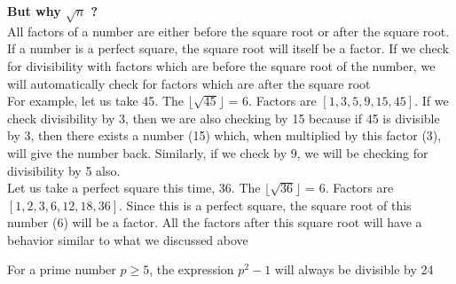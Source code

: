 \begin{NOTE}
    \textbf{But why $\sqrt{n}$ ?} \\
    
    All factors of a number are either before the square root or after the square root. If a number is a perfect square, the square root will itself be a factor. If we check for divisibility with factors which are before the square root of the number, we will automatically check for factors which are after the square root \\

    For example, let us take 45. The $\lfloor \sqrt{45} \rfloor$ = $6$. Factors are $[1,3,5,9,15,45]$. If we check divisibility by 3, then we are also checking by 15 because if 45 is divisible by 3, then there exists a number (15) which, when multiplied by this factor (3), will give the number back. Similarly, if we check by 9, we will be checking for divisibility by 5 also. \\

    Let us take a perfect square this time, 36. The $\lfloor \sqrt{36} \rfloor$ = $6$. Factors are $[1,2,3,6,12,18,36]$. Since this is a perfect square, the square root of this number (6) will be a factor. All the factors after this square root will have a behavior similar to what we discussed above
\end{NOTE}

\begin{theorem}
    For a prime number $p \geq 5$, the expression $p^2 - 1$ will always be divisible by 24 
\end{theorem}

